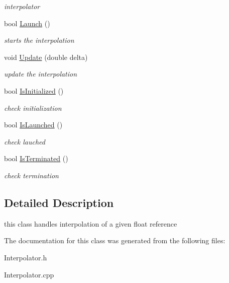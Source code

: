 \begin{DoxyCompactItemize}
\begin{DoxyCompactList}\small\item\em interpolator \end{DoxyCompactList}\item 
\hypertarget{class_interpolator_a182bcccb3504de291030202ce822c9a4}{bool \hyperlink{class_interpolator_a182bcccb3504de291030202ce822c9a4}{Launch} ()}\label{class_interpolator_a182bcccb3504de291030202ce822c9a4}

\begin{DoxyCompactList}\small\item\em starts the interpolation \end{DoxyCompactList}\item 
\hypertarget{class_interpolator_a54d361f3219059379586114d30ae16c0}{void \hyperlink{class_interpolator_a54d361f3219059379586114d30ae16c0}{Update} (double delta)}\label{class_interpolator_a54d361f3219059379586114d30ae16c0}

\begin{DoxyCompactList}\small\item\em update the interpolation \end{DoxyCompactList}\item 
\hypertarget{class_interpolator_a54ac4fba539c3068677972674d7792b1}{bool \hyperlink{class_interpolator_a54ac4fba539c3068677972674d7792b1}{Is\-Initialized} ()}\label{class_interpolator_a54ac4fba539c3068677972674d7792b1}

\begin{DoxyCompactList}\small\item\em check initialization \end{DoxyCompactList}\item 
\hypertarget{class_interpolator_a3cecf56b83c456f59f53e9ffff4aca4f}{bool \hyperlink{class_interpolator_a3cecf56b83c456f59f53e9ffff4aca4f}{Is\-Launched} ()}\label{class_interpolator_a3cecf56b83c456f59f53e9ffff4aca4f}

\begin{DoxyCompactList}\small\item\em check lauched \end{DoxyCompactList}\item 
\hypertarget{class_interpolator_ac8bfcdacf3b7973c925cb027057ed598}{bool \hyperlink{class_interpolator_ac8bfcdacf3b7973c925cb027057ed598}{Is\-Terminated} ()}\label{class_interpolator_ac8bfcdacf3b7973c925cb027057ed598}

\begin{DoxyCompactList}\small\item\em check termination \end{DoxyCompactList}\end{DoxyCompactItemize}


\subsection{Detailed Description}
this class handles interpolation of a given float reference 

The documentation for this class was generated from the following files\-:\begin{DoxyCompactItemize}
\item 
Interpolator.\-h\item 
Interpolator.\-cpp\end{DoxyCompactItemize}
